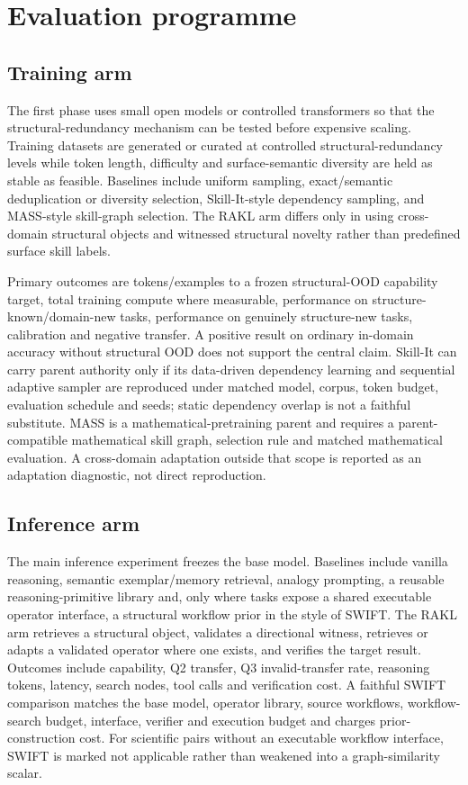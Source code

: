 \section{Evaluation programme}

\subsection{Training arm}

The first phase uses small open models or controlled transformers so that the structural-redundancy mechanism can be tested before expensive scaling. Training datasets are generated or curated at controlled structural-redundancy levels while token length, difficulty and surface-semantic diversity are held as stable as feasible. Baselines include uniform sampling, exact/semantic deduplication or diversity selection, Skill-It-style dependency sampling, and MASS-style skill-graph selection. The RAKL arm differs only in using cross-domain structural objects and witnessed structural novelty rather than predefined surface skill labels.

Primary outcomes are tokens/examples to a frozen structural-OOD capability target, total training compute where measurable, performance on structure-known/domain-new tasks, performance on genuinely structure-new tasks, calibration and negative transfer. A positive result on ordinary in-domain accuracy without structural OOD does not support the central claim. Skill-It can carry parent authority only if its data-driven dependency learning and sequential adaptive sampler are reproduced under matched model, corpus, token budget, evaluation schedule and seeds; static dependency overlap is not a faithful substitute. MASS is a mathematical-pretraining parent and requires a parent-compatible mathematical skill graph, selection rule and matched mathematical evaluation. A cross-domain adaptation outside that scope is reported as an adaptation diagnostic, not direct reproduction.

\subsection{Inference arm}

The main inference experiment freezes the base model. Baselines include vanilla reasoning, semantic exemplar/memory retrieval, analogy prompting, a reusable reasoning-primitive library and, only where tasks expose a shared executable operator interface, a structural workflow prior in the style of SWIFT. The RAKL arm retrieves a structural object, validates a directional witness, retrieves or adapts a validated operator where one exists, and verifies the target result. Outcomes include capability, Q2 transfer, Q3 invalid-transfer rate, reasoning tokens, latency, search nodes, tool calls and verification cost. A faithful SWIFT comparison matches the base model, operator library, source workflows, workflow-search budget, interface, verifier and execution budget and charges prior-construction cost. For scientific pairs without an executable workflow interface, SWIFT is marked not applicable rather than weakened into a graph-similarity scalar.

